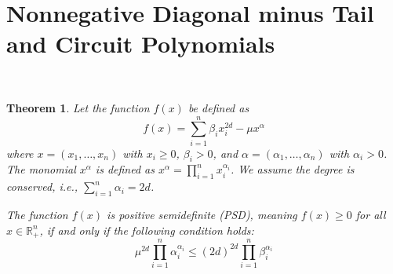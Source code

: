 \documentclass{article}
\newtheorem{theorem}{Theorem}
\begin{document}
\section{Nonnegative Diagonal minus Tail and Circuit Polynomials}\label{s02}
~~
\begin{theorem}
Let the function $f(x)$ be defined as
\[
   f(x) = \sum_{i=1}^n \beta_i x_i^{2d} - \mu x^{\alpha}
\]
where $x = (x_1, \dots, x_n)$ with $x_i \geq 0$, $\beta_i > 0$, and $\alpha = (\alpha_1, \dots, \alpha_n)$ with 
$\alpha_i > 0$. The monomial $x^{\alpha}$ is defined as $x^{\alpha} = \prod_{i=1}^n x_i^{\alpha_i}$. We assume the 
degree is conserved, i.e., $\sum_{i=1}^n \alpha_i = 2d$.

The function $f(x)$ is positive semidefinite (PSD), meaning $f(x) \geq 0$ for all $x \in \mathbb{R}_+^n$, if and only 
if the following condition holds:
\[
   \mu^{2d} \prod_{i=1}^n \alpha_i^{\alpha_i} \leq (2d)^{2d} \prod_{i=1}^n \beta_i^{\alpha_i}
\]
\end{theorem}
\end{document}
